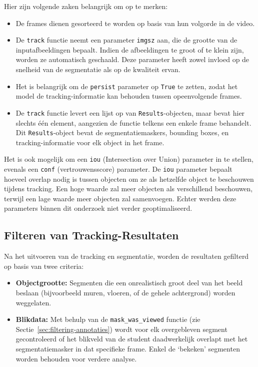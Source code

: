 Hier zijn volgende zaken belangrijk om op te merken:
\begin{itemize}
    \item De frames dienen gesorteerd te worden op basis van hun volgorde in de video.
    \item De \texttt{track} functie neemt een parameter \texttt{imgsz} aan, die de grootte van de inputafbeeldingen bepaalt.
    Indien de afbeeldingen te groot of te klein zijn, worden ze automatisch geschaald.
    Deze parameter heeft zowel invloed op de snelheid van de segmentatie als op de kwaliteit ervan.
    \item Het is belangrijk om de \texttt{persist} parameter op \texttt{True} te zetten, 
    zodat het model de tracking-informatie kan behouden tussen opeenvolgende frames.
    \item De \texttt{track} functie levert een lijst op van \texttt{Results}-objecten, maar bevat hier slechts één element, aangezien de functie telkens een enkele frame behandelt.
    Dit \texttt{Results}-object bevat de segmentatiemaskers, bounding boxes, en tracking-informatie voor elk object in het frame.
\end{itemize}
Het is ook mogelijk om een \texttt{iou} (Intersection over Union) parameter in te stellen, evenals een \texttt{conf} (vertrouwensscore) parameter.
De \texttt{iou} parameter bepaalt hoeveel overlap nodig is tussen objecten om ze als hetzelfde object te beschouwen tijdens tracking.
Een hoge waarde zal meer objecten als verschillend beschouwen, terwijl een lage waarde meer objecten zal samenvoegen.
Echter werden deze parameters binnen dit onderzoek niet verder geoptimaliseerd.

\subsection{Filteren van Tracking-Resultaten}

Na het uitvoeren van de tracking en segmentatie, worden de resultaten gefilterd op basis van twee criteria:
\begin{itemize}
    \item \textbf{Objectgrootte:} Segmenten die een onrealistisch groot deel van het beeld beslaan (bijvoorbeeld muren, vloeren, of de gehele achtergrond) worden weggelaten.
    \item \textbf{Blikdata:} Met behulp van de \texttt{mask\_was\_viewed} functie (zie Sectie~\ref{sec:filtering-annotaties}) 
    wordt voor elk overgebleven segment gecontroleerd of het blikveld van de student daadwerkelijk overlapt met het segmentatiemasker in dat specifieke frame. 
    Enkel de `bekeken' segmenten worden behouden voor verdere analyse.
\end{itemize}

